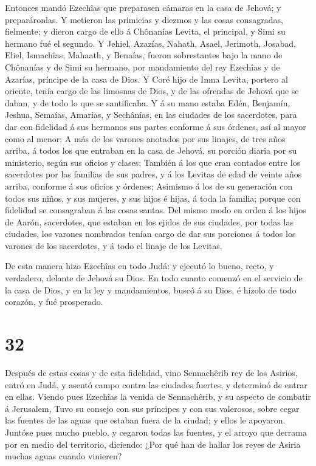  Entonces mandó Ezechîas que preparasen cámaras en la casa
de Jehová; y preparáronlas.  Y metieron las primicias y
diezmos y las cosas consagradas, fielmente; y dieron cargo de ello á
Chônanías Levita, el principal, y Simi su hermano fué el segundo.
 Y Jehiel, Azazías, Nahath, Asael, Jerimoth, Josabad,
Eliel, Ismachîas, Mahaath, y Benaías, fueron sobrestantes bajo la mano
de Chônanías y de Simi su hermano, por mandamiento del rey Ezechîas y de
Azarías, príncipe de la casa de Dios.  Y Coré hijo de Imna
Levita, portero al oriente, tenía cargo de las limosnas de Dios, y de
las ofrendas de Jehová que se daban, y de todo lo que se santificaba.
 Y á su mano estaba Edén, Benjamín, Jeshua, Semaías,
Amarías, y Sechânías, en las ciudades de los sacerdotes, para dar con
fidelidad á sus hermanos sus partes conforme á sus órdenes, así al mayor
como al menor:  A más de los varones anotados por sus
linajes, de tres años arriba, á todos los que entraban en la casa de
Jehová, su porción diaria por su ministerio, según sus oficios y clases;
 También á los que eran contados entre los sacerdotes por
las familias de sus padres, y á los Levitas de edad de veinte años
arriba, conforme á sus oficios y órdenes;  Asimismo á los
de su generación con todos sus niños, y sus mujeres, y sus hijos é
hijas, á toda la familia; porque con fidelidad se consagraban á las
cosas santas.  Del mismo modo en orden á los hijos de
Aarón, sacerdotes, que estaban en los ejidos de sus ciudades, por todas
las ciudades, los varones nombrados tenían cargo de dar sus porciones á
todos los varones de los sacerdotes, y á todo el linaje de los Levitas.

 De esta manera hizo Ezechîas en todo Judá: y ejecutó lo
bueno, recto, y verdadero, delante de Jehová su Dios.  En
todo cuanto comenzó en el servicio de la casa de Dios, y en la ley y
mandamientos, buscó á su Dios, é hízolo de todo corazón, y fué
prosperado.

\hypertarget{section-31}{%
\section{32}\label{section-31}}

 Después de estas cosas y de esta fidelidad, vino
Sennachêrib rey de los Asirios, entró en Judá, y asentó campo contra las
ciudades fuertes, y determinó de entrar en ellas.  Viendo
pues Ezechîas la venida de Sennachêrib, y su aspecto de combatir á
Jerusalem,  Tuvo su consejo con sus príncipes y con sus
valerosos, sobre cegar las fuentes de las aguas que estaban fuera de la
ciudad; y ellos le apoyaron.  Juntóse pues mucho pueblo, y
cegaron todas las fuentes, y el arroyo que derrama por en medio del
territorio, diciendo: ¿Por qué han de hallar los reyes de Asiria muchas
aguas cuando vinieren?

